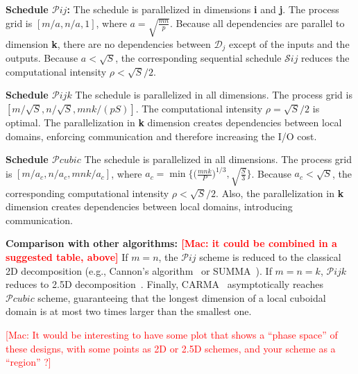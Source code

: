 \documentclass[sigplan,review,anonymous,10pt]{acmart}\settopmatter{printfolios=true,printccs=false,printacmref=false}
\newcommand\greg[1]{\textcolor{blue}{[Greg: #1]}}
\newcommand\mac[1]{\textcolor{red}{[Mac: #1]}}
\newcommand{\macb}[1]{\textbf{\textsf{#1}}}
\begin{document}

\macb{Schedule $\mathcal{P}ij$:} 
%
The schedule is parallelized in dimensions \textbf{i} and \textbf{j}. The
process grid is $[m/a , n/a, 1]$, where $a = \sqrt{\frac{mn}{p}}$.  Because all
dependencies are parallel to dimension \textbf{k}, there are no dependencies
between $\mathcal{D}_j$ except of the inputs and the outputs.  Because $a <
\sqrt{S}$, the corresponding sequential schedule $\mathcal{S}ij$ reduces the
computational intensity $\rho < \sqrt{S}/2$.

\macb{Schedule $\mathcal{P}ijk$}
%
The schedule is parallelized in all dimensions. The process grid is
$[m/\sqrt{S} , n/\sqrt{S}, mnk/(pS)]$.  The
computational intensity $\rho = \sqrt{S}/2$ is optimal. The parallelization in
\textbf{k} dimension creates dependencies between local domains, enforcing
communication and therefore increasing the I/O cost.

\macb{Schedule $\mathcal{P}cubic$} 
%
The schedule is parallelized in all dimensions. The process grid is $[m/a_c ,
n/a_c, mnk/a_c]$, where $a_c = \min\Big\{\big(\frac{mnk}{P}\big)^{1/3},
\sqrt{\frac{S}{3}}\Big\}$. Because $a_c < \sqrt{S}$, the corresponding
computational intensity $\rho < \sqrt{S}/2$.  Also,  the parallelization in
\textbf{k} dimension creates dependencies between local domains, introducing 
communication. 

\macb{Comparison with other algorithms: \mac{it could be combined in a
suggested table, above}}
%
If $m = n$, the $\mathcal{P}ij$ scheme is reduced to the classical 2D
decomposition (e.g., Cannon's algorithm~\cite{Cannon} or SUMMA~\cite{summa}).
If $m = n = k$, $\mathcal{P}ijk$ reduces to 2.5D decomposition~\cite{25d}.
Finally, CARMA~\cite{CARMA} asymptotically reaches $\mathcal{P}cubic$ scheme,
guaranteeing that the longest dimension of a local cuboidal domain is at most
two times larger than the smallest one.

\mac{It would be interesting to have some plot that shows a ``phase space''
of these designs, with some points as 2D or 2.5D schemes, and your scheme
as a ``region'' ?}

%
\end{document}
